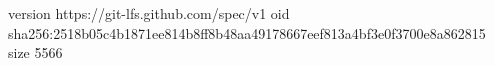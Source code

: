 version https://git-lfs.github.com/spec/v1
oid sha256:2518b05c4b1871ee814b8ff8b48aa49178667eef813a4bf3e0f3700e8a862815
size 5566
